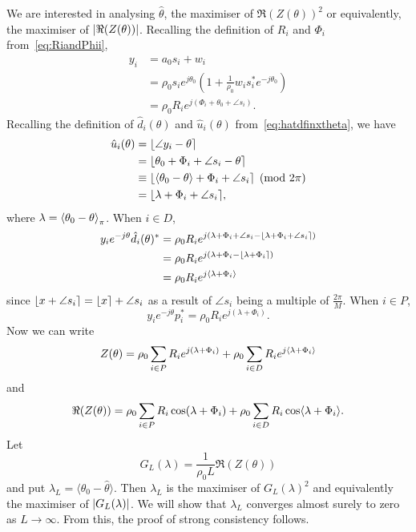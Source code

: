 \documentclass[journal]{IEEEtran}
\begin{document}
\begin{IEEEproof}
We are interested in analysing $\hat{\theta}$, the maximiser of $\Re(Z(\theta))^2$ or equivalently, the maximiser of ${\left| \Re(Z(\theta)) \right|}$.  Recalling the definition of $R_i$ and $\Phi_i$ from~\eqref{eq:RiandPhii},
\begin{align*}
y_i &= a_0 s_i + w_i \\
&= \rho_0 s_i e^{j \theta_0}\left( 1 + \frac{1}{\rho_0} w_i s_i^* e^{-j \theta_0} \right) \\
&= \rho_0 R_i e^{j ( \Phi_i + \theta_0 + \angle{s_i}) }.
\end{align*}
Recalling the definition of $\hat{d}_i(\theta)$ and $\hat{u}_i(\theta)$ from~\eqref{eq:hatdfinxtheta}, we have
\begin{align*}
\hat{u}_i(\theta) &= {\left\lfloor \angle{y_i} - \theta \right\rceil} \\
&= {\left\lfloor \theta_0 + \Phi_i + \angle{s_i} - \theta \right\rceil} \\
&\equiv {\left\lfloor  \left\langle \theta_0 - \theta \right\rangle + \Phi_i + \angle{s_i} \right\rceil} \pmod{2\pi} \\
&= {\left\lfloor  \lambda + \Phi_i + \angle{s_i}  \right\rceil},
\end{align*}
where $\lambda = \left\langle \theta_0 - \theta \right\rangle_\pi$.  When $i \in D$,
\begin{align*}
 y_i e^{-j\theta} \hat{d}_i(\theta)^* &= \rho_0 R_i e^{j(\lambda + \Phi_i + \angle{s_i} - {\left\lfloor \lambda + \Phi_i + \angle{s_i} \right\rceil})} \\
&= \rho_0 R_i e^{j(\lambda + \Phi_i - {\left\lfloor \lambda + \Phi_i \right\rceil})} \\
&= \rho_0 R_i e^{j\langle \lambda + \Phi_i \rangle}
\end{align*}
since ${\left\lfloor x + \angle{s_i} \right\rceil} = {\left\lfloor x \right\rceil} + \angle{s_i}$ as a result of $\angle{s_i}$ being a multiple of $\tfrac{2\pi}{M}$.  When $i \in P$,  
\[
y_i e^{-j\theta} p_i^* = \rho_0 R_i e^{j(\lambda + \Phi_i)}.
\]
Now we can write
\[
Z(\theta) = \rho_0 \sum_{i \in P} R_i e^{j(\lambda + \Phi_i)} + \rho_0  \sum_{i \in D} R_i e^{j\langle \lambda + \Phi_i \rangle}
\]
and
\[
\Re(Z(\theta)) = \rho_0 \sum_{i \in P} R_i \cos(\lambda + \Phi_i) + \rho_0 \sum_{i \in D} R_i \cos\langle \lambda + \Phi_i \rangle.
\] 
Let 
\[
G_L(\lambda) = \frac{1}{\rho_0 L} \Re(Z(\theta))
\]
and put $\lambda_L = \langle\theta_0 - \hat{\theta}\rangle$.  Then $\lambda_L$ is the maximiser of $G_L(\lambda)^2$ and equivalently the maximiser of ${\left| G_L(\lambda) \right|}$.  We will show that $\lambda_L$ converges almost surely to zero as $L \rightarrow \infty$.  From this, the proof of strong consistency follows.


\end{IEEEproof}
\end{document}
